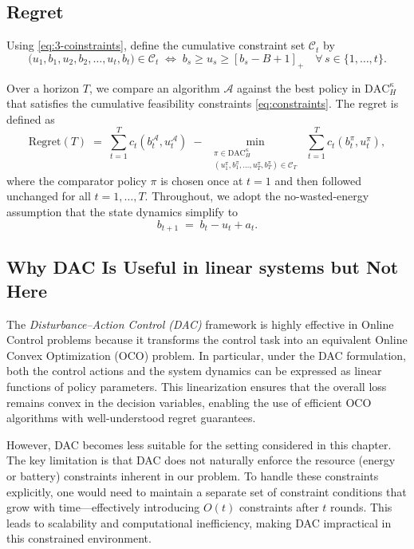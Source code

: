 \subsection{Regret}
\label{sec:dac-regret}


Using \eqref{eq:3-coinstraints}, define the cumulative constraint set \(\mathcal{C}_t\) by
\begin{equation}
\label{eq:constraints}
\bigl(u_1,b_1,u_2,b_2,\ldots,u_t,b_t\bigr) \in \mathcal{C}_t
\;\Longleftrightarrow\;
b_s \ge u_s \ge [b_s - B + 1]_+ \quad \forall\, s \in \{1,\dots,t\}.
\end{equation}

Over a horizon \(T\), we compare an algorithm \(\mathcal{A}\) against the best policy in \(\mathrm{DAC}_H^\kappa\) that satisfies the cumulative feasibility constraints \eqref{eq:constraints}. The regret is defined as
\begin{equation}\label{eq:dac-regret}
\mathrm{Regret}(T)
\;=\;
\sum_{t=1}^T  c_t\!\left(b_t^\mathcal{A},u_t^\mathcal{A}\right)
\;-\;
\min_{\substack{\pi\in \mathrm{DAC}_H^\kappa\\ (u_1^\pi,b_1^\pi,\ldots,u_T^\pi,b_T^\pi)\in \mathcal{C}_T}}
\; \sum_{t=1}^T  c_t\!\left(b_t^\pi,u_t^\pi\right),
\end{equation}
where the comparator policy \(\pi\) is chosen once at \(t=1\) and then followed unchanged for all \(t=1,\dots,T\). Throughout, we adopt the no-wasted-energy assumption that the state dynamics simplify to
\begin{equation}
\label{eq:evo-no-saturation-recall}
b_{t+1} \;=\; b_t - u_t + a_t .
\end{equation}


\subsection{Why DAC Is Useful in linear systems but Not Here}
\label{sec:why-dac-new}

The \emph{Disturbance–Action Control (DAC)} framework is highly effective in Online Control problems because it transforms the control task into an equivalent Online Convex Optimization (OCO) problem.  
In particular, under the DAC formulation, both the control actions and the system dynamics can be expressed as linear functions of policy parameters.  
This linearization ensures that the overall loss remains convex in the decision variables, enabling the use of efficient OCO algorithms with well-understood regret guarantees.

However, DAC becomes less suitable for the setting considered in this chapter.  
The key limitation is that DAC does not naturally enforce the resource (energy or battery) constraints inherent in our problem.  
To handle these constraints explicitly, one would need to maintain a separate set of constraint conditions that grow with time—effectively introducing $O(t)$ constraints after $t$ rounds.  
This leads to scalability and computational inefficiency, making DAC impractical in this constrained environment.

